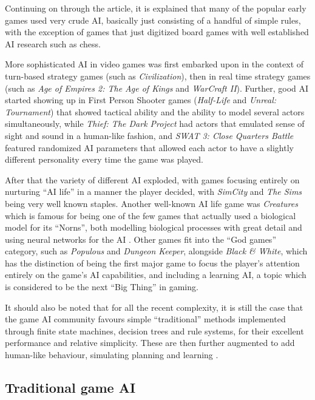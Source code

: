\documentclass[]{report}
\begin{document}
Continuing on through the article, it is explained that many of the popular
early games used very crude AI, basically just consisting of a handful of simple
rules, with the exception of games that just digitized board games with well
established AI research such as chess.

More sophisticated AI in video games was first embarked upon in the context of
turn-based strategy games (such as \emph{Civilization}), then in real time
strategy games (such as \emph{Age of Empires 2: The Age of Kings} and
\emph{WarCraft II}). Further, good AI started showing up in First Person Shooter
games (\emph{Half-Life} and \emph{Unreal: Tournament}) that showed tactical
ability and the ability to model several actors simultaneously, while
\emph{Thief: The Dark Project} had actors that emulated sense of sight and sound
in a human-like fashion, and \emph{SWAT 3: Close Quarters Battle} featured
randomized AI parameters that allowed each actor to have a slightly different
personality every time the game was played.

After that the variety of different AI exploded, with games focusing entirely on
nurturing ``AI life'' in a manner the player decided, with \emph{SimCity} and
\emph{The Sims} being very well known staples. Another well-known AI life game
was \emph{Creatures} which is famous for being one of the few games that
actually used a biological model for its ``Norns'', both modelling biological
processes with great detail and using neural networks for the AI
\citep[see][]{grand1997creatures}. Other games fit into the ``God games''
category, such as \emph{Populous} and \emph{Dungeon Keeper}, alongside
\emph{Black \& White}, which has the distinction of being the first major game
to focus the player's attention entirely on the game's AI capabilities, and
including a learning AI, a topic which is considered to be the next ``Big
Thing'' in gaming.

It should also be noted that for all the recent complexity, it is still the case
that the game AI community favours simple ``traditional'' methods implemented
through finite state machines, decision trees and rule systems, for their
excellent performance and relative simplicity. These are then further augmented
to add human-like behaviour, simulating planning and learning
\citep[see][]{orkin2003applying,isla2002new,khoo2002efficient,mateas2002behavior}.

\subsection{Traditional game AI}
\label{sec:traditional-game-ai}
\end{document}
